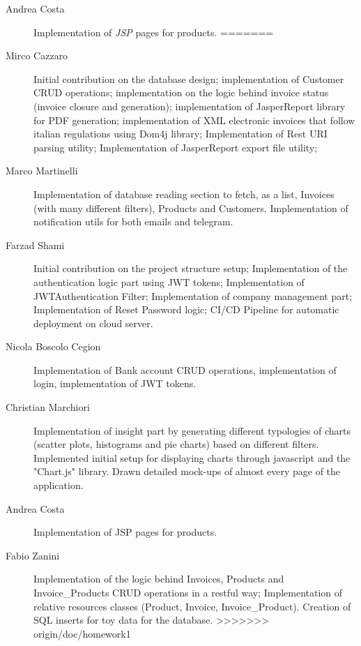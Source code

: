 \begin{description}
	\item[Andrea Costa] Implementation of \textit{JSP} pages for products.
=======
	\item[Mirco Cazzaro] Initial contribution on the database design; implementation of Customer CRUD operations; implementation on the logic behind invoice status (invoice closure and generation); implementation of JasperReport library for PDF generation; implementation of XML electronic invoices that follow italian regulations using Dom4j library; Implementation of Rest URI parsing utility; Implementation of JasperReport export file utility;
	\item[Marco Martinelli] Implementation of database reading section to fetch, as a list, Invoices (with many different filters), Products and Customers. Implementation of notification utils for both emails and telegram. 
	\item[Farzad Shami] Initial contribution on the project structure setup; Implementation of the authentication logic part using JWT tokens; Implementation of JWTAuthentication Filter; Implementation of company management part; Implementation of Reset Password logic; CI/CD Pipeline for automatic deployment on cloud server.
	\item[Nicola Boscolo Cegion] Implementation of Bank account CRUD operations, implementation of login, implementation of JWT tokens.
	\item[Christian Marchiori] Implementation of insight part by generating different typologies of charts (scatter plots, histograms and pie charts) based on different filters. Implemented initial setup for displaying charts through javascript and the "Chart.js" library. Drawn detailed mock-ups of almost every page of the application.
	\item[Andrea Costa] Implementation of JSP pages for products.
	\item[Fabio Zanini] Implementation of the logic behind Invoices, Products and Invoice\_Products CRUD operations in a restful way; Implementation of relative resources classes (Product, Invoice, Invoice\_Product). Creation of SQL inserts for toy data for the database.
>>>>>>> origin/doc/homework1
\end{description}
